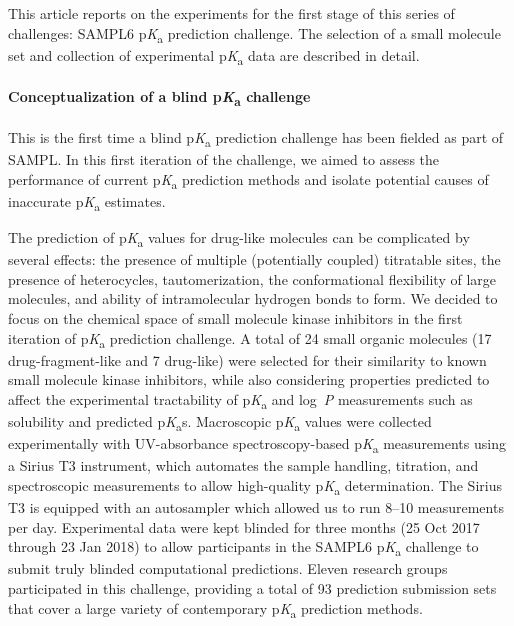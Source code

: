 \documentclass[9pt,lineno]{elife}
\newcommand{\pKa}{p\textit{K}\textsubscript{a}}
\newcommand{\logD}{log~\textit{D}}
\newcommand{\logP}{log~\textit{P}}
\begin{document}
This article reports on the experiments for the first stage of this series of challenges: SAMPL6 \pKa{} prediction challenge. 
The selection of a small molecule set and collection of experimental \pKa{} data are described in detail.

\paragraph{Conceptualization of a blind \pKa{} challenge}

This is the first time a blind \pKa{} prediction challenge has been fielded as part of SAMPL. 
In this first iteration of the challenge, we aimed to assess the performance of current \pKa{} prediction methods and isolate potential causes of inaccurate \pKa{} estimates.

The prediction of \pKa{} values for drug-like molecules can be complicated by several effects: the presence of multiple (potentially coupled) titratable sites, the presence of heterocycles, tautomerization, the conformational flexibility of large molecules, and ability of intramolecular hydrogen bonds to form. 
We decided to focus on the chemical space of small molecule kinase inhibitors in the first iteration of \pKa{} prediction challenge. 
A total of 24 small organic molecules (17 drug-fragment-like and 7 drug-like) were selected for their similarity to known small molecule kinase inhibitors, while also considering properties predicted to affect the experimental tractability of \pKa{} and \logP{} measurements such as solubility and predicted \pKa{}s. 
Macroscopic \pKa{} values were collected experimentally with UV-absorbance spectroscopy-based \pKa{} measurements using a Sirius T3 instrument, which automates the sample handling, titration, and spectroscopic measurements to allow high-quality \pKa{} determination. 
The Sirius T3 is equipped with an autosampler which allowed us to run 8--10 measurements per day.
Experimental data were kept blinded for three months (25 Oct 2017 through 23 Jan 2018) to allow participants in the SAMPL6 \pKa{} challenge to submit truly blinded computational predictions. 
Eleven research groups participated in this challenge, providing a total of 93 prediction submission sets that cover a large variety of contemporary \pKa{} prediction methods. 
 
\end{document}
